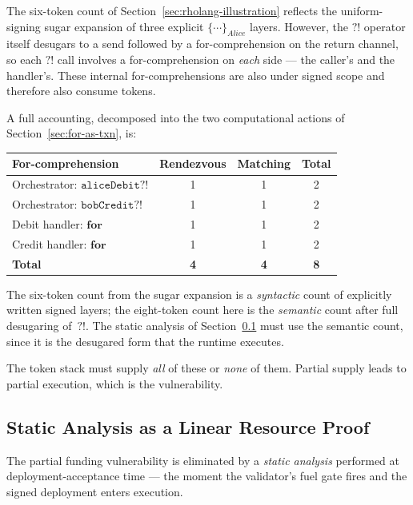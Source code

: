 \documentclass[11pt,a4paper]{article}
\newcommand{\forc}{\mathbf{for}}
\newcommand{\signed}[2]{\{#1\}_{#2}}
\begin{document}
The six-token count of Section~\ref{sec:rholang-illustration}
reflects the uniform-signing sugar expansion of three explicit
$\signed{\cdots}{\mathit{Alice}}$ layers.  However, the
$\mathtt{?!}$ operator itself desugars to a send followed by a
for-comprehension on the return channel, so each $\mathtt{?!}$
call involves a for-comprehension on \emph{each} side --- the
caller's and the handler's.  These internal for-comprehensions
are also under signed scope and therefore also consume tokens.

A full accounting, decomposed into the two computational
actions of Section~\ref{sec:for-as-txn}, is:

\begin{center}
  \begin{tabular}{lccc}
    \textbf{For-comprehension}
      & \textbf{Rendezvous}
      & \textbf{Matching}
      & \textbf{Total} \\
    \midrule
    Orchestrator: $\mathtt{aliceDebit?!}$
      & 1 & 1 & 2 \\
    Orchestrator: $\mathtt{bobCredit?!}$
      & 1 & 1 & 2 \\
    Debit handler: $\forc$
      & 1 & 1 & 2 \\
    Credit handler: $\forc$
      & 1 & 1 & 2 \\
    \midrule
    \textbf{Total} & \textbf{4} & \textbf{4} & \textbf{8} \\
  \end{tabular}
\end{center}

\noindent
The six-token count from the sugar expansion is a
\emph{syntactic} count of explicitly written signed layers;
the eight-token count here is the \emph{semantic} count after
full desugaring of~$\mathtt{?!}$.  The static analysis of
Section~\ref{sec:linear-proof} must use the semantic count,
since it is the desugared form that the runtime executes.

The token stack must supply \emph{all} of these or
\emph{none} of them.  Partial supply leads to partial
execution, which is the vulnerability.

\subsection{Static Analysis as a Linear Resource Proof}
\label{sec:linear-proof}

The partial funding vulnerability is eliminated by a
\emph{static analysis} performed at deployment-acceptance
time --- the moment the validator's fuel gate fires and the
signed deployment enters execution.
\end{document}
